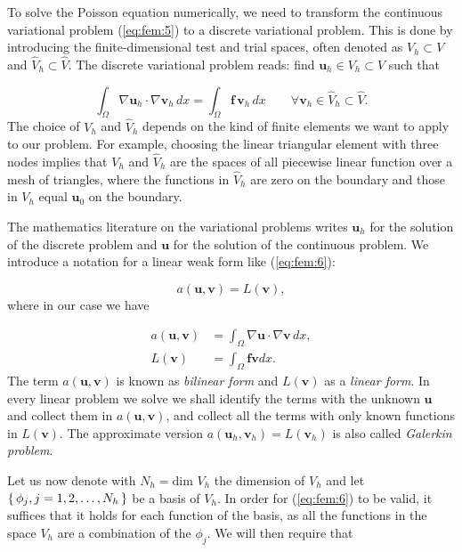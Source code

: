 \documentclass[a4paper,11pt,oneside]{book}
\begin{document}
To solve the Poisson equation numerically, we need to transform the continuous variational problem (\ref{eq:fem:5}) to a discrete variational problem. This is done by introducing the finite-dimensional test and trial spaces, often denoted as $V_h \subset V$ and $\hat{V}_h \subset \hat{V}$. The discrete variational problem reads: find $\mathbf{u}_h \in V_h \subset V$ such that 

\begin{equation}
\label{eq:fem:6}
\int_\Omega \nabla \mathbf{u}_h \cdot \nabla \mathbf{v}_h \, dx = \int_\Omega \mathbf{f} \, \mathbf{v}_h \, dx \qquad \forall \mathbf{v}_h \in \hat{V}_h \subset \hat{V}.
\end{equation}
The choice of $V_h$ and $\hat{V}_h$ depends on the kind of finite elements we want to apply to our problem. For example, choosing the linear triangular element with three nodes implies that $V_h$ and $\hat{V}_h$ are the spaces of all piecewise linear function over a mesh of triangles, where the functions in $\hat{V}_h$ are zero on the boundary and those in $V_h$ equal $\mathbf{u}_0$ on the boundary.

The mathematics literature on the variational problems writes $\mathbf{u}_h$ for the solution of the discrete problem and $\mathbf{u}$ for the solution of the continuous problem. We introduce a notation for a linear weak form like (\ref{eq:fem:6}):

\begin{equation}
a(\mathbf{u}, \mathbf{v}) = L(\mathbf{v}),
\end{equation}
where in our case we have

\begin{align}
a(\mathbf{u}, \mathbf{v}) &= \int_\Omega \nabla \mathbf{u} \cdot \nabla \mathbf{v} \, dx, \\ 
L(\mathbf{v}) &= \int_\Omega \mathbf{f} \mathbf{v} dx.
\end{align}
The term $a(\mathbf{u}, \mathbf{v})$ is known as \emph{bilinear form} and $L(\mathbf{v})$ as a \emph{linear form}. In every linear problem we solve we shall identify the terms with the unknown $\mathbf{u}$ and collect them in $a(\mathbf{u}, \mathbf{v})$, and collect all the terms with only known functions in $L(\mathbf{v})$. The approximate version $a(\mathbf{u}_h, \mathbf{v}_h) = L(\mathbf{v}_h)$ is also called \emph{Galerkin problem}.

Let us now denote with $N_h = \text{dim } V_h $ the dimension of $V_h$ and let $\set{\phi_j, j = 1,2, \ldots, N_h }$ be a basis of $V_h$. In order for (\ref{eq:fem:6}) to be valid, it suffices that it holds for each function of the basis, as all the functions in the space $V_h$ are a combination of the $\phi_j$. We will then require that
\end{document}
